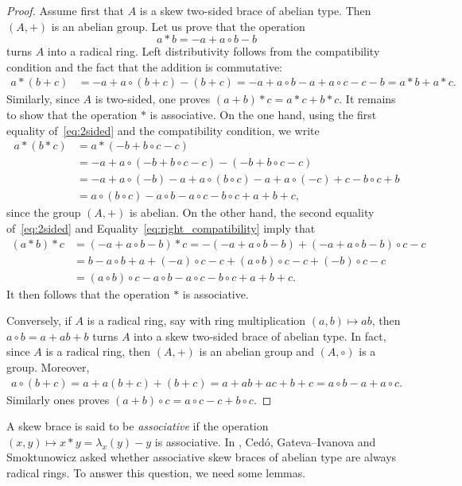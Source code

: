 \begin{proof}
    Assume first that $A$ is a skew two-sided brace of abelian type. Then $(A,+)$ is an abelian group. 
    Let us prove that the operation
    \[
    a*b=-a+a\circ b-b
    \]
    turns $A$ into a radical ring. Left distributivity follows from the compatibility condition and the fact that the addition is commutative:
    \begin{align*}
    a*(b+c)&=-a+a\circ (b+c)-(b+c)
    =-a+a\circ b-a+a\circ c-c-b=a*b+a*c.
    \end{align*}
    Similarly, since $A$ is two-sided, one proves $(a+b)*c=a*c+b*c$. It remains to show that the operation $*$
    is associative. On the one hand, using the first equality of~\eqref{eq:2sided} 
    and the compatibility condition, we write
    \begin{align*}
    a*(b*c)&=a*(-b+b\circ c-c)\\
    &=-a+a\circ(-b+b\circ c-c)-(-b+b\circ c-c)\\
    &=-a+a\circ (-b)-a+a\circ(b\circ c)-a+a\circ (-c)+c-b\circ c+b\\
    &=a\circ (b\circ c)-a\circ b-a\circ c-b\circ c+a+b+c,
    \end{align*}
    since the group $(A,+)$ is abelian. On the other hand, the second equality of~\eqref{eq:2sided} and
    Equality~\eqref{eq:right_compatibility} imply that
    \begin{align*}
    (a*b)*c &= (-a+a\circ b-b)*c=-(-a+a\circ b-b)+(-a+a\circ b-b)\circ c-c\\
    &=b-a\circ b+a+(-a)\circ c-c+(a\circ b)\circ c-c+(-b)\circ c-c\\
    &=(a\circ b)\circ c-a\circ b-a\circ c-b\circ c+a+b+c.
    \end{align*}
    It then follows that the operation $*$ is associative. 
    
    Conversely, if $A$ is a radical ring, say with ring multiplication $(a,b)\mapsto ab$, 
    then $a\circ b=a+ab+b$ turns $A$ into a skew two-sided brace 
    of abelian type. In fact, since $A$ is a radical ring, then 
    $(A,+)$ is an abelian group and $(A,\circ)$ is a group. Moreover, 
    \begin{align*}
        a\circ (b+c)=a+a(b+c)+(b+c)=a+ab+ac+b+c=a\circ b-a+a\circ c.
    \end{align*}
    Similarly ones proves $(a+b)\circ c=a\circ c-c+b\circ c$.
\end{proof}

A skew brace is said to be \emph{associative} if the operation $(x,y)\mapsto
x*y=\lambda_x(y)-y$ is associative. In \cite[Question 2.1(2)]{MR3818285}, 
Cedó, Gateva--Ivanova and Smoktunowicz asked whether associative skew braces of abelian type are always radical rings. 
To answer this question, we need some lemmas. 

